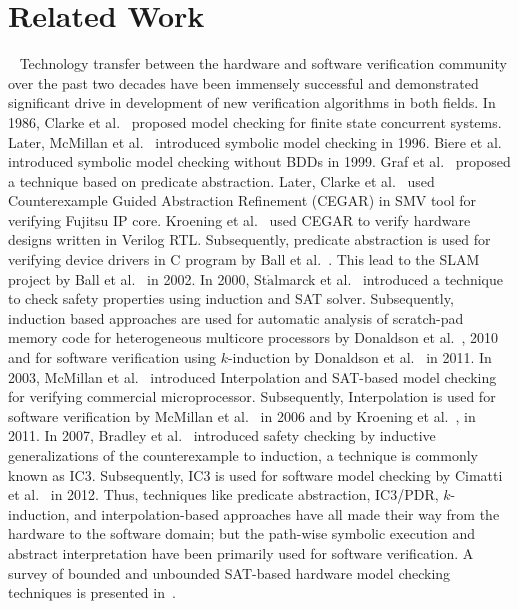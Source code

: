 \section{Related Work}~\label{related_work}
%
Technology transfer between the hardware and software verification community 
over the past two decades have been immensely successful and demonstrated significant 
drive in development of new verification algorithms in both fields. 
% 
In 1986, Clarke et al.~\cite{clarke86} proposed model checking for finite state 
concurrent systems. Later, McMillan et al.~\cite{mcmillan96} introduced symbolic 
model checking in 1996.  Biere et al.~\cite{tacas99} introduced symbolic model 
checking without BDDs in 1999.
%
Graf et al.~\cite{cav97} proposed a technique based on predicate abstraction.
Later, Clarke et al.~\cite{cav2000} used Counterexample Guided Abstraction Refinement 
(CEGAR) in SMV tool for verifying Fujitsu IP core.  
Kroening et al.~\cite{himanshu} used CEGAR to 
verify hardware designs written in Verilog RTL.  Subsequently, predicate 
abstraction is used for verifying device drivers in C program by Ball et al.~\cite{pldi01}.  
This lead to the SLAM project by Ball et al.~\cite{popl02} in 2002.
%
In 2000, St$\mathring{\text{a}}$lmarck et al.~\cite{fmcad2000} introduced a technique 
to check safety properties using induction and SAT solver.  Subsequently, induction 
based approaches are used for automatic analysis of scratch-pad memory code for heterogeneous
multicore processors by Donaldson et al.~\cite{tacas10}, 2010 and for software 
verification using $k$-induction by Donaldson et al.~\cite{sas2011} in 2011.
% 
In 2003, McMillan et al.~\cite{cav03} introduced Interpolation and SAT-based model 
checking for verifying commercial microprocessor. Subsequently, Interpolation is used 
for software verification by McMillan et al.~\cite{cav06} in 2006 and by 
Kroening et al.~\cite{DBLP:conf/cav/KroeningW11}, in 2011.
%
In 2007, Bradley et al.~\cite{fmcad07} introduced safety checking by inductive 
generalizations of the counterexample to induction, a technique is commonly known 
as IC3. Subsequently, IC3 is used for software model checking by 
Cimatti et al.~\cite{cav12ic3} in 2012.
% 
Thus, techniques like predicate abstraction, 
IC3/PDR, $k$-induction, and interpolation-based 
approaches have all made their way from the hardware 
to the software domain; but the path-wise symbolic execution and abstract 
interpretation have been primarily used for software verification.
%
A survey of bounded and unbounded SAT-based hardware model checking techniques 
is presented in~\cite{DBLP:conf/charme/AmlaDKKM05}.
%

